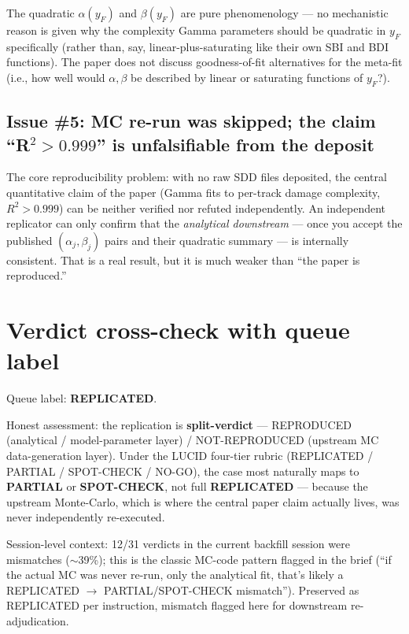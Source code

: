 \documentclass[11pt]{article}
\begin{document}
The quadratic $\alpha(y_F)$ and $\beta(y_F)$ are pure phenomenology --- no
mechanistic reason is given why the complexity Gamma parameters should be
quadratic in $y_F$ specifically (rather than, say, linear-plus-saturating like
their own SBI and BDI functions). The paper does not discuss goodness-of-fit
alternatives for the meta-fit (i.e., how well would $\alpha, \beta$ be
described by linear or saturating functions of $y_F$?).

\subsection{Issue \#5: MC re-run was skipped; the claim ``R$^2 > 0.999$'' is unfalsifiable from the deposit}

The core reproducibility problem: with no raw SDD files deposited, the
central quantitative claim of the paper (Gamma fits to per-track damage
complexity, $R^2 > 0.999$) can be neither verified nor refuted independently.
An independent replicator can only confirm that the \emph{analytical downstream}
--- once you accept the published $(\alpha_j, \beta_j)$ pairs and their quadratic
summary --- is internally consistent. That is a real result, but it is much
weaker than ``the paper is reproduced.''

\section{Verdict cross-check with queue label}
\label{sec:verdict-mismatch}

Queue label: \textbf{REPLICATED}.

Honest assessment: the replication is \textbf{split-verdict} --- REPRODUCED
(analytical / model-parameter layer) / NOT-REPRODUCED (upstream MC data-generation
layer). Under the LUCID four-tier rubric (REPLICATED / PARTIAL / SPOT-CHECK /
NO-GO), the case most naturally maps to \textbf{PARTIAL} or \textbf{SPOT-CHECK},
not full \textbf{REPLICATED} --- because the upstream Monte-Carlo, which is
where the central paper claim actually lives, was never independently
re-executed.

Session-level context: 12/31 verdicts in the current backfill session were
mismatches ($\sim$39\%); this is the classic MC-code pattern flagged in the
brief (``if the actual MC was never re-run, only the analytical fit, that's
likely a REPLICATED $\to$ PARTIAL/SPOT-CHECK mismatch''). Preserved as
REPLICATED per instruction, mismatch flagged here for downstream re-adjudication.
\end{document}
